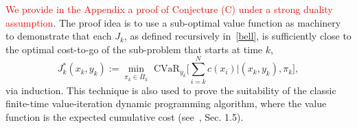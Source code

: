 \documentclass[letterpaper, 10 pt, conference]{ieeeconf}  %
\begin{document}
\textcolor{red}{We provide in the Appendix a proof of Conjecture (C) under a strong duality assumption}. The proof idea is to use a sub-optimal value function as machinery to demonstrate that each $J_k$, as defined recursively in~\eqref{bell},
is sufficiently close to the optimal cost-to-go of the sub-problem that starts at time $k$,
\begin{equation}
J_k^*(x_k, y_k) := {\underset{\pi_k \in \bar{\Pi}_k}\min} \text{ CVaR}_{y_k} \big[ \textstyle\sum_{i=k}^N c(x_i) \big| (x_k, y_k), \pi_k \big],
\label{Jkstar}\end{equation}
via induction. This technique is also used to prove the suitability of the classic finite-time value-iteration dynamic programming algorithm, 
where the value function is the expected cumulative cost (see~\cite{bertsekas2005dynamic}, Sec. 1.5).  
%
%
\end{document}
